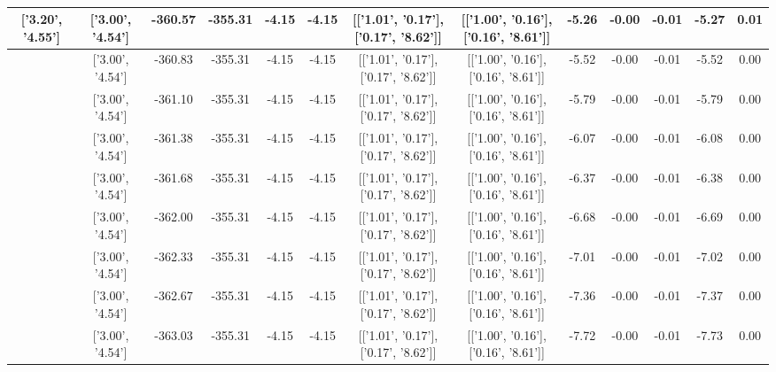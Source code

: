 \begin{table}[htbp]
\begin{adjustbox}{angle=90}
\begin{tabular}{|c|c|c|c|c|c|c|c|c|c|c|c|c|}
 ['3.20', '4.55'] & ['3.00', '4.54'] & -360.57 & -355.31 & -4.15 & -4.15 & [['1.01', '0.17'], ['0.17', '8.62']] & [['1.00', '0.16'], ['0.16', '8.61']] & -5.26 & -0.00 & -0.01 & -5.27 & 0.01\\ \hline
 ['3.21', '4.55'] & ['3.00', '4.54'] & -360.83 & -355.31 & -4.15 & -4.15 & [['1.01', '0.17'], ['0.17', '8.62']] & [['1.00', '0.16'], ['0.16', '8.61']] & -5.52 & -0.00 & -0.01 & -5.52 & 0.00\\ \hline
 ['3.22', '4.55'] & ['3.00', '4.54'] & -361.10 & -355.31 & -4.15 & -4.15 & [['1.01', '0.17'], ['0.17', '8.62']] & [['1.00', '0.16'], ['0.16', '8.61']] & -5.79 & -0.00 & -0.01 & -5.79 & 0.00\\ \hline
 ['3.23', '4.55'] & ['3.00', '4.54'] & -361.38 & -355.31 & -4.15 & -4.15 & [['1.01', '0.17'], ['0.17', '8.62']] & [['1.00', '0.16'], ['0.16', '8.61']] & -6.07 & -0.00 & -0.01 & -6.08 & 0.00\\ \hline
 ['3.25', '4.55'] & ['3.00', '4.54'] & -361.68 & -355.31 & -4.15 & -4.15 & [['1.01', '0.17'], ['0.17', '8.62']] & [['1.00', '0.16'], ['0.16', '8.61']] & -6.37 & -0.00 & -0.01 & -6.38 & 0.00\\ \hline
 ['3.26', '4.56'] & ['3.00', '4.54'] & -362.00 & -355.31 & -4.15 & -4.15 & [['1.01', '0.17'], ['0.17', '8.62']] & [['1.00', '0.16'], ['0.16', '8.61']] & -6.68 & -0.00 & -0.01 & -6.69 & 0.00\\ \hline
 ['3.27', '4.56'] & ['3.00', '4.54'] & -362.33 & -355.31 & -4.15 & -4.15 & [['1.01', '0.17'], ['0.17', '8.62']] & [['1.00', '0.16'], ['0.16', '8.61']] & -7.01 & -0.00 & -0.01 & -7.02 & 0.00\\ \hline
 ['3.28', '4.56'] & ['3.00', '4.54'] & -362.67 & -355.31 & -4.15 & -4.15 & [['1.01', '0.17'], ['0.17', '8.62']] & [['1.00', '0.16'], ['0.16', '8.61']] & -7.36 & -0.00 & -0.01 & -7.37 & 0.00\\ \hline
 ['3.29', '4.56'] & ['3.00', '4.54'] & -363.03 & -355.31 & -4.15 & -4.15 & [['1.01', '0.17'], ['0.17', '8.62']] & [['1.00', '0.16'], ['0.16', '8.61']] & -7.72 & -0.00 & -0.01 & -7.73 & 0.00\\ \hline
            \end{tabular}
        \end{adjustbox}
        \caption{}
        \label{}
    \end{table}
    